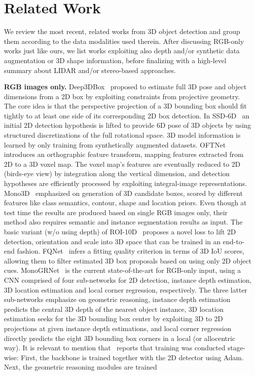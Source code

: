 \documentclass[10pt,twocolumn,letterpaper]{article}
\renewcommand{\paragraph}[1]{

        \vspace{3pt}
	\noindent\textbf{#1}}
\begin{document}
\section{Related Work}
We review the most recent, related works from 3D object detection and group them according to the data modalities used therein. After discussing RGB-only works just like ours, we list works exploiting also depth and/or synthetic data augmentation or 3D shape information, before finalizing with a high-level summary about LIDAR and/or stereo-based approaches.

\paragraph{RGB images only.} 
Deep3DBox~\cite{Mousavian_2017_CVPR} proposed to estimate full 3D pose and object dimensions from a 2D box by exploiting constraints from projective geometry. The core idea is that the perspective projection of a 3D bounding box should fit tightly to at least one side of its corresponding 2D box detection. In SSD-6D~\cite{Kehl_2017_ICCV} an initial 2D detection hypothesis is lifted to provide 6D pose of 3D objects by using structured discretizations of the full rotational space. 3D model information is learned by only training from synthetically augmented datasets. OFTNet~\cite{Roddick18} introduces an orthographic feature transform, mapping features extracted from 2D to a 3D voxel map. The voxel map's features are eventually reduced to 2D (birds-eye view) by integration along the vertical dimension, and detection hypotheses are efficiently processed by exploiting integral-image representations. Mono3D~\cite{Chen_2016_CVPR} emphasized on generation of 3D candidate boxes, scored by different features like class semantics, contour, shape and location priors. Even though at test time the results are produced based on single RGB images only, their method also requires semantic and instance segmentation results as input. The basic variant (w/o using depth) of ROI-10D~\cite{Manhardt_2019_CVPR} proposes a novel loss to lift 2D detection, orientation and scale into 3D space that can be trained in an end-to-end fashion. FQNet~\cite{Liu+19} infers a fitting quality criterion in terms of 3D IoU scores, allowing them to filter estimated 3D box proposals based on using only 2D object cues. MonoGRNet~\cite{qin2019monogrnet} is the current state-of-the-art for RGB-only input, using a CNN comprised of four sub-networks for 2D detection, instance depth estimation, 3D location estimation and local corner regression, respectively. The three latter sub-networks emphasize on geometric reasoning, \ie instance depth estimation predicts the central 3D depth of the nearest object instance, 3D location estimation seeks for the 3D bounding box center by exploiting 3D to 2D projections at given instance depth estimations, and local corner regression directly predicts the eight 3D bounding box corners in a local (or allocentric~\cite{Kundu_2018_CVPR,Manhardt_2019_CVPR} way). It is relevant to mention that~\cite{qin2019monogrnet} reports that training was conducted stage-wise: First, the backbone is trained together with the 2D detector using Adam. Next, the geometric reasoning modules are trained 
\end{document}

